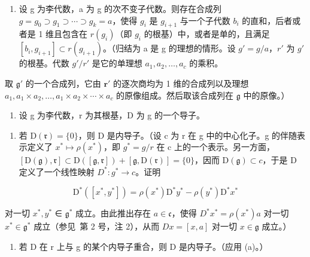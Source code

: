 \begin{enumerate}
\def\labelenumi{(\alph{enumi})}
\setcounter{enumi}{1}
\tightlist
\item
  设 g 为李代数，a 为 g 的次不变子代数。则存在合成列 \(g = g_{0} \supset g_{1} \supset \cdots \supset g_{k} = a\)，使得 \(g_{i}\) 是 \(g_{i+1}\) 与一个子代数 \(b_{i}\) 的直和，后者或者是 1 维且包含在 \(r(g_{i})\)（即 \(g_{i}\) 的根基）中，或者是单的，且满足 \([b_{i}, g_{i+1}] \subset r(g_{i+1})\)。（归结为 a 是 g 的理想的情形。设 \(g' = g/a\)，\(r'\) 为 \(g'\) 的根基。代数 \(g'/r'\) 是它的单理想 \(a_{1}, a_{2}, \ldots, a_{c}\) 的乘积。
\end{enumerate}

取 \(\mathfrak{g}'\) 的一个合成列，它由 \(\mathbf{r}'\) 的逐次商均为 1 维的合成列以及理想 \(a_1, a_1 \times a_2, \ldots, a_1 \times a_2 \times \cdots \times a_c\) 的原像组成。然后取该合成列在 \(\mathfrak{g}\) 中的原像。）

\begin{enumerate}
\def\labelenumi{\arabic{enumi}.}
\setcounter{enumi}{11}
\tightlist
\item
  设 g 为李代数，r 为其根基，D 为 g 的一个导子。
\end{enumerate}

\begin{enumerate}
\def\labelenumi{(\alph{enumi})}
\tightlist
\item
  若 \(\mathrm{D}(\mathfrak{r}) = \{0\} \)，则 D 是内导子。（设 c 为 r 在 g 中的中心化子。g 的伴随表示定义了 \(x^{*} \mapsto \rho(x^{*})\)，即 \(g^{*} = g/r\) 在 c 上的一个表示。另一方面，\([\mathrm{D}(\mathfrak{g}), \mathfrak{r}] \subset \mathrm{D}([\mathfrak{g}, \mathfrak{r}]) + [\mathfrak{g}, \mathrm{D}(\mathfrak{r})] = \{0\}\)，因而 \(\mathrm{D}(\mathfrak{g}) \subset c\)，于是 D 定义了一个线性映射 \(D^{*}: g^{*} \to c\)。证明
\end{enumerate}

\[
\mathrm{D} ^ {*} ([ x ^ {*}, y ^ {*} ]) = \rho (x ^ {*}) \mathrm{D} ^ {*} y ^ {*} - \rho (y ^ {*}) \mathrm{D} ^ {*} x ^ {*}
\]

对一切 \(x^{*}, y^{*}\) ∈ \(\mathfrak{g}^{*}\) 成立。由此推出存在 \(a \in \mathfrak{c}\)，使得 \(D^{*}x^{*} = \rho(x^{*})a\) 对一切 \(x^{*} \in \mathfrak{g}^{*}\) 成立（参见~第 2 号，注 2），从而 \(Dx = [x, a]\) 对一切 \(x \in \mathfrak{g}\) 成立。）

\begin{enumerate}
\def\labelenumi{(\alph{enumi})}
\setcounter{enumi}{1}
\tightlist
\item
  若 D 在 r 上与 g 的某个内导子重合，则 D 是内导子。（应用 (a)。）
\end{enumerate}


